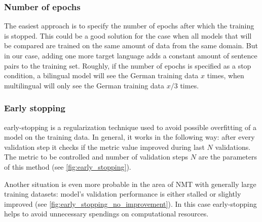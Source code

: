 \subsubsection*{Number of \glspl{epoch}}

The easiest approach is to specify the number of \glspl{epoch}
after which the training is stopped.
This could be a good solution for the case when all models
that will be compared are trained on the same amount of data from
the same domain.
But in our case, adding one more target language adds a constant
amount of sentence pairs to the training set.
Roughly, if the number of \glspl{epoch} is specified as a stop
condition, a bilingual  model will see the German
training data $x$ times, when multilingual 
will only see the German training data $x / 3$ times.

\subsubsection*{Early stopping}

\Gls{early-stopping} is a regularization technique used to avoid
possible \gls{overfitting} of a model on the training data.
In general, it works in the following way: after every validation step
it checks if the metric value improved during last $N$ validations.
The metric to be controlled and number of validation steps $N$ are
the parameters of this method
(see \cref{fig:early_stopping}).

Another situation is even more probable in the area of NMT with generally
large training datasets: model's validation performance
is either stalled or slightly improved
(see \cref{fig:early_stopping_no_improvement}).
In this case \gls{early-stopping} helps to avoid unnecessary spendings
on computational resources.

